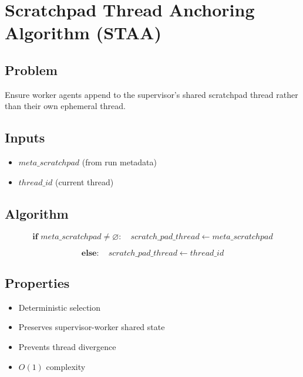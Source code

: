 \section{Scratchpad Thread Anchoring Algorithm (STAA)}

\subsection*{Problem}

Ensure worker agents append to the supervisor’s shared scratchpad thread
rather than their own ephemeral thread.

\subsection*{Inputs}

\begin{itemize}
    \item $meta\_scratchpad$ (from run metadata)
    \item $thread\_id$ (current thread)
\end{itemize}

\subsection*{Algorithm}

\[
\textbf{if } meta\_scratchpad \neq \varnothing:
\quad scratch\_pad\_thread \leftarrow meta\_scratchpad
\]

\[
\textbf{else}:
\quad scratch\_pad\_thread \leftarrow thread\_id
\]

\subsection*{Properties}

\begin{itemize}
    \item Deterministic selection
    \item Preserves supervisor-worker shared state
    \item Prevents thread divergence
    \item $O(1)$ complexity
\end{itemize}